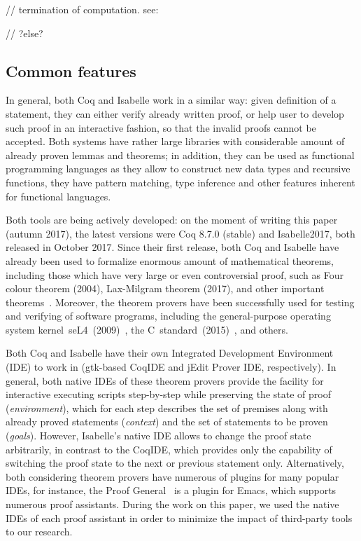 \documentclass[article]{aaltoseries}
\begin{document}
// termination of computation. see: %

// ?else?



\subsection{Common features}

In general, both Coq and Isabelle work in a similar way: given definition of a statement, they can either verify already written proof, or help user to develop such proof in an interactive fashion, so that the invalid proofs cannot be accepted. Both systems have rather large libraries with considerable amount of already proven lemmas and theorems; in addition, they can be used as functional programming languages as they allow to construct new data types and recursive functions, they have pattern matching, type inference and other features inherent for functional languages.

Both tools are being actively developed: on the moment of writing this paper (autumn 2017), the latest versions were Coq 8.7.0 (stable) and Isabelle2017, both released in October 2017. Since their first release, both Coq and Isabelle have already been used to formalize enormous amount of mathematical theorems, including those which have very large or even controversial proof, such as Four colour theorem (2004), Lax-Milgram theorem (2017), and other important theorems~\cite{Wiedijk100}. Moreover, the theorem provers have been successfully used for testing and verifying of software programs, including the general-purpose operating system kernel~seL4~(2009)~\cite{Klein09}, the C~standard~(2015)~\cite{Krebbers15}, and others.

Both Coq and Isabelle have their own Integrated Development Environment (IDE) to work in (gtk-based CoqIDE and jEdit Prover IDE, respectively). In general, both native IDEs of these theorem provers provide the facility for interactive executing scripts step-by-step while preserving the state of proof (\textit{environment}), which for each step describes the set of premises along with already proved statements (\textit{context}) and the set of statements to be proven (\textit{goals}). However, Isabelle's native IDE allows to change the proof state arbitrarily, in contrast to the CoqIDE, which provides only the capability of switching the proof state to the next or previous statement only. Alternatively, both considering theorem provers have numerous of plugins for many popular IDEs, for instance, the Proof General~\cite{tool_PG} is a plugin for Emacs, which supports numerous proof assistants. During the work on this paper, we used the native IDEs of each proof assistant in order to minimize the impact of third-party tools to our research.
\end{document}
